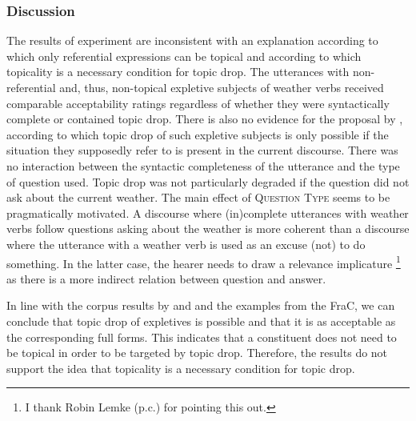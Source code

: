 \subsubsection{Discussion}
The results of experiment  are inconsistent with an explanation according to which only referential expressions can be topical and according to which topicality is a necessary condition for topic drop.
The utterances with non-referential and, thus, non-topical expletive subjects of weather verbs received comparable acceptability ratings regardless of whether they were syntactically complete or contained topic drop.
There is also no evidence for the proposal by \citet{trutkowski2011, trutkowski2016}, according to which topic drop of such expletive subjects is only possible if the situation they supposedly refer to is present in the current discourse.
There was no interaction between the syntactic completeness of the utterance and the type of question used.
Topic drop was not particularly degraded if the question did not ask about the current weather.
The main effect of \textsc{Question Type} seems to be pragmatically motivated.
A discourse where (in)complete utterances with weather verbs follow questions asking about the weather is more coherent than a discourse where the utterance with a weather verb is used as an excuse (not) to do something.
In the latter case, the hearer needs to draw a relevance implicature%
\footnote{I thank Robin Lemke (p.c.) for pointing this out.}
%
 as there is a more indirect relation between question and answer.

In line with the corpus results by \citet{frick2017} and \citet{ruppenhofer2018} and the examples from the FraC, we can conclude that topic drop of expletives is possible and that it is as acceptable as the corresponding full forms.
This indicates that a constituent does not need to be topical in order to be targeted by topic drop.
Therefore, the results do not support the idea that topicality is a necessary condition for topic drop. 

